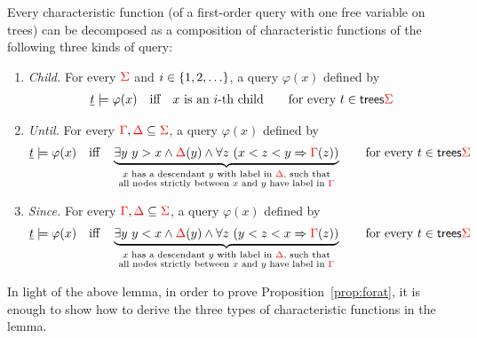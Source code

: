 \begin{lemma}\label{lem:schlingloff} Every characteristic function (of a first-order query with one free variable on trees) can be decomposed as a composition of characteristic functions of the following three kinds of  query:
    \begin{enumerate}
        \item \emph{Child.} For every ${\color{red}{\Sigma}}$ and  $i \in \{1,2,\ldots\}$, a query $\varphi(x)$ defined by
        \begin{align*}
            \underline t \models \varphi(x) \quad \text{iff} \quad \text{$x$ is an $i$-th child}\qquad \text{for every $t \in \mathsf {trees} {\color{red}{\Sigma}}$}
        \end{align*}
         \item \emph{Until.} For every ${\color{red}{\Gamma}}, {\color{red}{\Delta}} \subseteq {\color{red}{\Sigma}}$, a query $\varphi(x)$ defined by
         \begin{align*}
             \underline t \models \varphi(x) \quad \text{iff} \quad \underbrace{\exists y\ y > x \land {\color{red}{\Delta}}(y) \land  \forall z \ (x < z < y \Rightarrow {\color{red}{\Gamma}}(z))}_{\substack{\text{$x$ has a descendant $y$ with label in ${\color{red}{\Delta}}$, such that}\\ \text{all nodes strictly between $x$ and $y$ have label in ${\color{red}{\Gamma}}$}}}  \qquad \text{for every $t \in  \mathsf {trees} {\color{red}{\Sigma}}$}
         \end{align*} 
         \item \emph{Since.} For every ${\color{red}{\Gamma}}, {\color{red}{\Delta}} \subseteq {\color{red}{\Sigma}}$,  a query $\varphi(x)$ defined by
         \begin{align*}
             \underline t \models \varphi(x) \quad \text{iff} \quad \underbrace{\exists y\ y < x \land {\color{red}{\Delta}}(y) \land  \forall z \ (y < z < x \Rightarrow {\color{red}{\Gamma}}(z))}_{\substack{\text{$x$ has a descendant $y$ with label in ${\color{red}{\Delta}}$, such that}\\ \text{all nodes strictly between $x$ and $y$ have label in ${\color{red}{\Gamma}}$}}}  \qquad \text{for every $t \in  \mathsf {trees} {\color{red}{\Sigma}}$}
         \end{align*} 
    \end{enumerate}
\end{lemma}

In light of the above lemma, in order to prove Proposition~\ref{prop:forat}, it is enough to show how to derive the three types of characteristic functions in the lemma. 